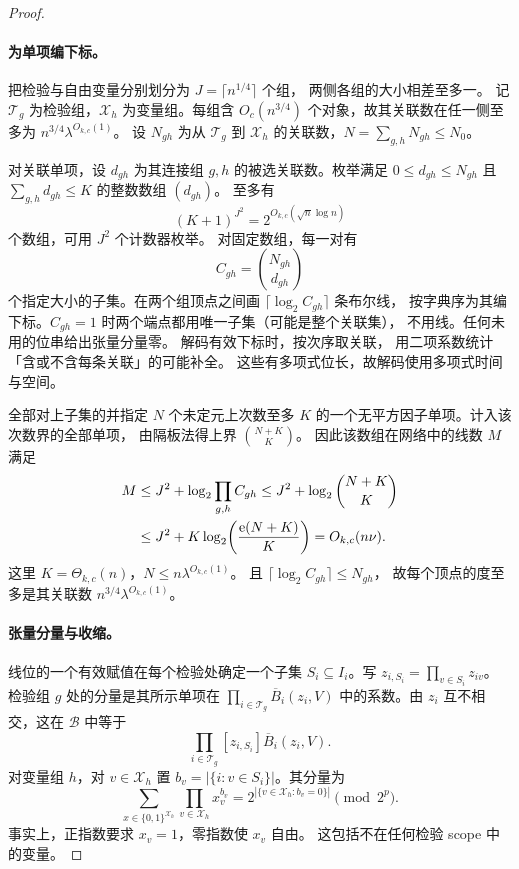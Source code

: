 \begin{proof}
\paragraph{为单项编下标。}
把检验与自由变量分别划分为
$J=\lceil n^{1/4}\rceil$ 个组，
两侧各组的大小相差至多一。
记 $\mathcal T_g$ 为检验组，$\mathcal X_h$
为变量组。每组含 $O_c(n^{3/4})$
个对象，故其关联数在任一侧至多为
$n^{3/4}\lambda^{O_{k,c}(1)}$。
设 $N_{gh}$ 为从 $\mathcal T_g$ 到 $\mathcal X_h$
的关联数，$N=\sum_{g,h}N_{gh}\le N_0$。

对关联单项，设 $d_{gh}$ 为其连接组 $g,h$
的被选关联数。枚举满足 $0\le d_{gh}\le N_{gh}$
且 $\sum_{g,h}d_{gh}\le K$ 的整数数组 $(d_{gh})$。
至多有
\[
 (K+1)^{J^2}=2^{O_{k,c}(\sqrt n\log n)}
\]
个数组，可用 $J^2$ 个计数器枚举。
对固定数组，每一对有
\[
 C_{gh}=\binom{N_{gh}}{d_{gh}}
\]
个指定大小的子集。在两个组顶点之间画
$\lceil\log_2 C_{gh}\rceil$ 条布尔线，
按字典序为其编下标。$C_{gh}=1$
时两个端点都用唯一子集（可能是整个关联集），
不用线。任何未用的位串给出张量分量零。
解码有效下标时，按次序取关联，
用二项系数统计「含或不含每条关联」的可能补全。
这些有多项式位长，故解码使用多项式时间与空间。

全部对上子集的并指定 $N$ 个未定元上次数至多 $K$
的一个无平方因子单项。计入该次数界的全部单项，
由隔板法得上界 $\binom{N+K}{K}$。
因此该数组在网络中的线数 $M$ 满足
\begin{align}
 M &\le J^2+\log_2\prod_{g,h} C_{gh}
      \le J^2+\log_2\binom{N+K}{K} \notag\\
   &\le J^2+K\log_2\!\left(\frac{\mathrm e(N+K)}{K}\right)
      = O_{k,c}(n\nu).
 \label{eq:sharp-wire-budget}
\end{align}
这里 $K=\Theta_{k,c}(n)$，$N\le n\lambda^{O_{k,c}(1)}$。
且 $\lceil\log_2 C_{gh}\rceil\le N_{gh}$，
故每个顶点的度至多是其关联数
$n^{3/4}\lambda^{O_{k,c}(1)}$。

\paragraph{张量分量与收缩。}
线位的一个有效赋值在每个检验处确定一个子集
$S_i\subseteq I_i$。写
$z_{i,S_i}=\prod_{v\in S_i}z_{iv}$。
检验组 $g$ 处的分量是其所示单项在
$\prod_{i\in\mathcal T_g}\overline B_i(z_i,V)$
中的系数。由 $z_i$ 互不相交，这在 $\mathcal B$
中等于
\[
 \prod_{i\in\mathcal T_g}[z_{i,S_i}]\overline B_i(z_i,V).
\]
对变量组 $h$，对 $v\in\mathcal X_h$
置 $b_v=|\{i:v\in S_i\}|$。其分量为
\[
 \sum_{x\in\{0,1\}^{\mathcal X_h}}
        \prod_{v\in\mathcal X_h}x_v^{b_v}
   =2^{|\{v\in\mathcal X_h:b_v=0\}|}\pmod{2^p}.
\]
事实上，正指数要求 $x_v=1$，零指数使 $x_v$ 自由。
这包括不在任何检验 scope 中的变量。


\end{proof}

